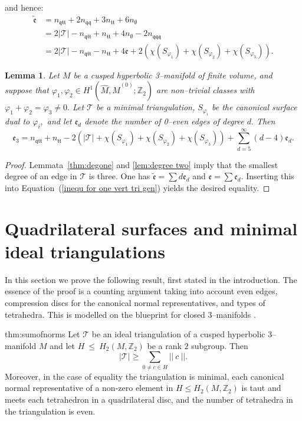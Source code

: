 \documentclass[a4paper]{gtart}
\def\tri{\mathcal{T}}
\def\manifold{M}
\def\Z{\mathbb{Z}}
\def\even{\mathfrak{e}}
\def\nee{n_{\emptyset}}
\def\ntt{n_{\mathfrak{tt}}}
\def\nqtt{n_{\mathfrak{qtt}}}
\def\nqq{n_{\mathfrak{qq}}}
\def\nqqq{n_{\mathfrak{qqq}}}
\theoremstyle{plain}
\newtheorem{lemma}[theorem]{Lemma}
\theoremstyle{definition}
\theoremstyle{remark}
\numberwithin{equation}{section}
\begin{document}
and hence:
\begin{align}\label{inequ for one vert tri gen}
\tilde{\even} 	&= \nqtt+2\nqq+3\ntt+6\nee\nonumber \\
		&=  2|\tri|  -\nqtt + \ntt +4\nee-2\nqqq  \nonumber\\
		&= 2|\tri|  - \nqtt - \ntt+4 \even+ 2 (\chi(S_{\varphi_1}) +\chi (S_{\varphi_2}) + \chi (S_{\varphi_3})).
\end{align}
\begin{lemma}\label{lem:formula for degree 3 edges}
Let $\manifold$ be a cusped hyperbolic 3--manifold of finite volume, and suppose that $\varphi_1, \varphi_2 \in  H^1(\widehat{\manifold}, \widehat{\manifold}^{(0)}; \Z_2)$ are non--trivial classes with $\varphi_1+\varphi_2 = \varphi_3 \neq 0.$ Let $\tri$ be a minimal triangulation, $S_{\varphi_i}$ be the canonical surface dual to $\varphi_i,$ and let $\even_d$ denote the number of 0--even edges of degree $d.$ Then
\begin{equation}\label{inequ for min tri general}
\even_3= \nqtt +\ntt - 2 (|\tri| + \chi(S_{\varphi_1}) +\chi (S_{\varphi_2}) +\chi (S_{\varphi_3})) + \sum_{d=5}^{\infty} (d-4) \even_d.
\end{equation}
\end{lemma}

\begin{proof}
Lemmata~\ref{thm:degone} and \ref{lem:degree two} imply that the smallest degree of an edge in $\tri$ is three. One has $\tilde{\even} = \sum d \even_d$ and $\even = \sum \even_d.$ Inserting this into Equation~(\ref{inequ for one vert tri gen}) yields the desired equality.
\end{proof}


\section{Quadrilateral surfaces and minimal ideal triangulations}
\label{sec:quadsurfs}

In this section we prove the following result, first stated in the introduction. The essence of the proof is a counting argument taking into account even edges, compression discs for the canonical normal representatives, and types of tetrahedra. This is modelled on the blueprint for closed 3--manifolds \cite{Jaco-Z2-2017, Jaco-minimal-2009, Jaco-Z2-2013, Nakamura-complexity-2017}.

\begin{reptheorem}{thm:sumofnorms}
  Let $\tri$ be an ideal triangulation of a cusped hyperbolic 3--manifold $\manifold$ and let $H~\le~H_2 (\manifold,\Z_2)$ be a rank $2$ subgroup. Then 
  $$|\tri| \geq \sum \limits_{0 \neq c \in H} || \ c \ ||. $$
  Moreover, in the case of equality the triangulation is minimal, each canonical normal representative of a non-zero element in $H\le H_2 (\manifold,\Z_2)$ is taut and meets each tetrahedron in a quadrilateral disc, and the number of tetrahedra in the triangulation is even.
\end{reptheorem}
\end{document}

